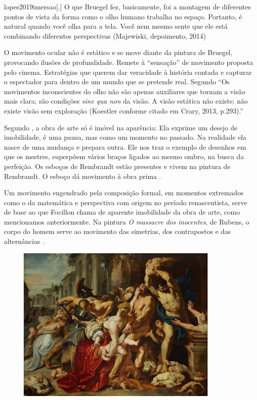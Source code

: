 \begin{displaycquote}[25]{lopes2019imersao}[.]
	O que Bruegel fez, basicamente, foi a montagem de diferentes pontos de
	vista da forma como o olho humano trabalha no espaço. Portanto, é
	natural quando você olha para a tela. Você nem mesmo sente que ele está
	combinando diferentes perspectivas (Majewiski, depoimento, 2014)
\end{displaycquote}

O movimento ocular não é estático e se move diante da pintura de
Bruegel, provocando ilusões de profundidade. Remete à
\enquote{sensação} de movimento proposta pelo cinema. Estratégias que
querem dar veracidade à história contada e capturar o espectador para
dentro de um mundo que se pretende real. Segundo \textcite[24]{lopes2019imersao}
\enquote{Os movimentos inconscientes do olho não são apenas auxiliares
	que tornam a visão mais clara; são condições \emph{sine qua non} da
	visão. \textelp{} A visão estática não existe; não existe visão sem
	exploração (Koestler conforme citado em Crary, 2013, p.293).}

Segundo \textcite{focillon1983vida}, a obra de arte só é imóvel na
aparência: Ela exprime um desejo de imobilidade, é uma pausa, mas como
um momento no passado. Na realidade ela nasce de uma mudança e prepara
outra. Ele nos traz o exemplo de desenhos em que os mestres, superpõem
vários braços ligados ao mesmo ombro, na busca da perfeição. Os esboços
de Rembrandt estão presentes e vivem na pintura de Rembrandt. O esboço
dá movimento à obra prima \parencite[18]{focillon1983vida}.

Um movimento engendrado pela composição formal, em momentos extremados
como o da matemática e perspectiva com origem no período renascentista,
serve de base ao que Focillon chama de aparente imobilidade da obra de
arte, como mencionamos anteriormente. Na pintura \emph{O massacre dos
	inocentes}, de Rubens, o corpo do homem serve ao movimento das
simetrias, dos contrapostos e das alternâncias \parencite{focillon1983vida}.

\begin{figure}
	\caption{}
	\includegraphics[width=3.88044in,height=3.00417in]{figuras/rubens-massacre-inocentes-1612.pdf.compressed.pdf}
\end{figure}

